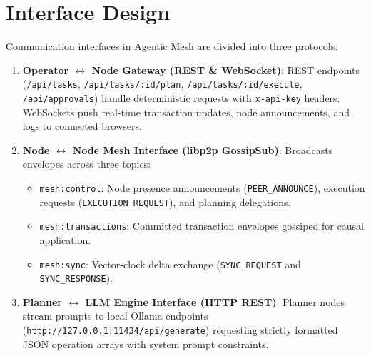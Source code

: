 \documentclass[12pt,a4paper]{report}
\begin{document}
\section{Interface Design}
Communication interfaces in Agentic Mesh are divided into three protocols:
\begin{enumerate}[label=\roman*.,leftmargin=*,itemsep=3pt]
    \item \textbf{Operator $\leftrightarrow$ Node Gateway (REST \& WebSocket)}: REST endpoints (\texttt{/api/tasks}, \texttt{/api/tasks/:id/plan}, \texttt{/api/tasks/:id/execute}, \texttt{/api/approvals}) handle deterministic requests with \texttt{x-api-key} headers. WebSockets push real-time transaction updates, node announcements, and logs to connected browsers.
    \item \textbf{Node $\leftrightarrow$ Node Mesh Interface (libp2p GossipSub)}: Broadcasts envelopes across three topics:
    \begin{itemize}[leftmargin=*,itemsep=1pt]
        \item \texttt{mesh:control}: Node presence announcements (\texttt{PEER\_ANNOUNCE}), execution requests (\texttt{EXECUTION\_REQUEST}), and planning delegations.
        \item \texttt{mesh:transactions}: Committed transaction envelopes gossiped for causal application.
        \item \texttt{mesh:sync}: Vector-clock delta exchange (\texttt{SYNC\_REQUEST} and \texttt{SYNC\_RESPONSE}).
    \end{itemize}
    \item \textbf{Planner $\leftrightarrow$ LLM Engine Interface (HTTP REST)}: Planner nodes stream prompts to local Ollama endpoints (\texttt{http://127.0.0.1:11434/api/generate}) requesting strictly formatted JSON operation arrays with system prompt constraints.
\end{enumerate}
\end{document}
